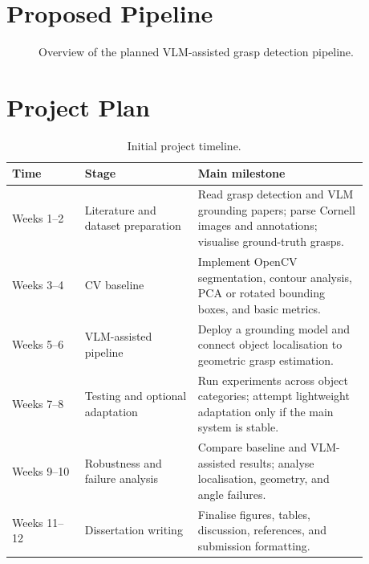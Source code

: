 \documentclass[11pt,a4paper]{article}
\begin{document}
\section{Proposed Pipeline}

\begin{figure}[h]
    \centering
    \caption{Overview of the planned VLM-assisted grasp detection pipeline.}
    \label{fig:pipeline}
\end{figure}

\section{Project Plan}

\begin{table}[h]
\centering
\caption{Initial project timeline.}
\label{tab:timeline}
\begin{tabular}{p{0.18\linewidth}p{0.28\linewidth}p{0.42\linewidth}}
\toprule
Time & Stage & Main milestone \\
\midrule
Weeks 1--2 & Literature and dataset preparation & Read grasp detection and VLM grounding papers; parse Cornell images and annotations; visualise ground-truth grasps. \\
Weeks 3--4 & CV baseline & Implement OpenCV segmentation, contour analysis, PCA or rotated bounding boxes, and basic metrics. \\
Weeks 5--6 & VLM-assisted pipeline & Deploy a grounding model and connect object localisation to geometric grasp estimation. \\
Weeks 7--8 & Testing and optional adaptation & Run experiments across object categories; attempt lightweight adaptation only if the main system is stable. \\
Weeks 9--10 & Robustness and failure analysis & Compare baseline and VLM-assisted results; analyse localisation, geometry, and angle failures. \\
Weeks 11--12 & Dissertation writing & Finalise figures, tables, discussion, references, and submission formatting. \\
\bottomrule
\end{tabular}
\end{table}
\end{document}

